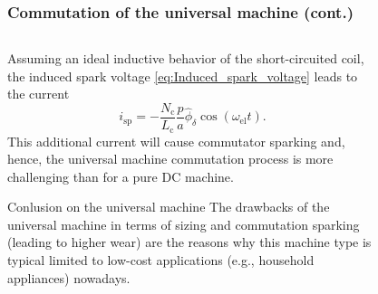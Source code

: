 \begin{frame}
	\frametitle{Commutation of the universal machine (cont.)}
	\begin{columns}
		\begin{column}{0.65\textwidth}
		Assuming an ideal inductive behavior of the short-circuited coil, the induced spark voltage \eqref{eq:Induced_spark_voltage} leads to the current
		\begin{equation}
			i_\mathrm{sp} = -\frac{N_\mathrm{c} }{L_\mathrm{c} } \frac{p}{a} \hat{\phi}_\delta \cos(\omega_\mathrm{el} t).
		\end{equation}
		\pause
		This additional current will cause commutator sparking and, hence, the universal machine commutation process is more challenging than for a pure DC machine. 
		\pause
		\vspace{-0.25cm}
		\begin{varblock}{Conlusion on the universal machine}
			The drawbacks of the universal machine in terms of sizing and commutation sparking (leading to higher wear) are the reasons why this machine type is typical limited to low-cost applications (e.g., household appliances) nowadays. 
		\end{varblock}
\end{column}
\hfill
\begin{column}{0.35\textwidth}
	\onslide<1->
	\begin{figure}
		\centering
		\includegraphics[scale=1]{fig/lec03/Commutation_universal_machine.pdf}
\end{figure}
\end{column}
\end{columns}
\end{frame}